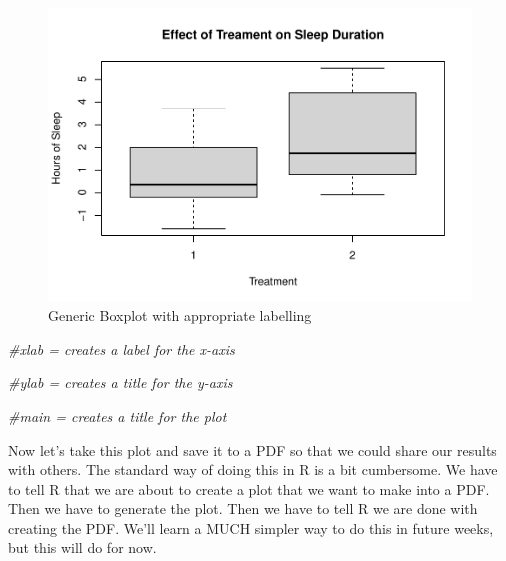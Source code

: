 \documentclass[
]{book}
\newenvironment{Shaded}{\begin{snugshade}}{\end{snugshade}}
\newcommand{\AttributeTok}[1]{\textcolor[rgb]{0.13,0.29,0.53}{#1}}
\newcommand{\CommentTok}[1]{\textcolor[rgb]{0.56,0.35,0.01}{\textit{#1}}}
\newcommand{\FunctionTok}[1]{\textcolor[rgb]{0.13,0.29,0.53}{\textbf{#1}}}
\newcommand{\NormalTok}[1]{#1}
\newcommand{\SpecialCharTok}[1]{\textcolor[rgb]{0.81,0.36,0.00}{\textbf{#1}}}
\newcommand{\StringTok}[1]{\textcolor[rgb]{0.31,0.60,0.02}{#1}}
\begin{document}
\begin{figure}
\centering
\includegraphics{gitbook-demo_files/figure-latex/unnamed-chunk-9-1.pdf}
\caption{\label{fig:unnamed-chunk-9}Generic Boxplot with appropriate labelling}
\end{figure}

\begin{Shaded}
\begin{Highlighting}[]
\CommentTok{\#xlab = creates a label for the x{-}axis  }

\CommentTok{\#ylab = creates a title for the y{-}axis  }

\CommentTok{\#main = creates a title for the plot  }
\end{Highlighting}
\end{Shaded}

Now let's take this plot and save it to a PDF so that we could share our results with others. The standard way of doing this in R is a bit cumbersome. We have to tell R that we are about to create a plot that we want to make into a PDF. Then we have to generate the plot. Then we have to tell R we are done with creating the PDF. We'll learn a MUCH simpler way to do this in future weeks, but this will do for now.

\begin{Shaded}
\end{Shaded}
\end{document}
